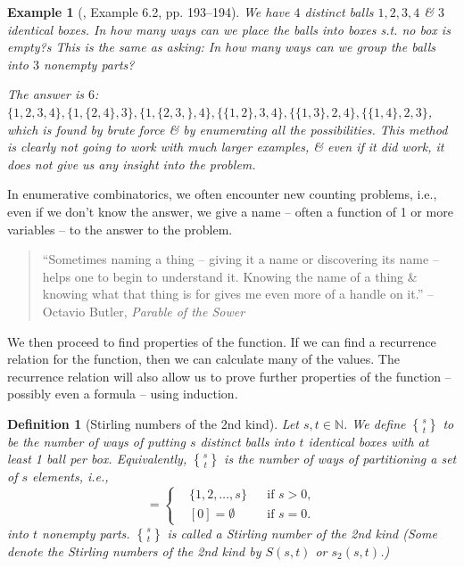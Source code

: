 \documentclass[oneside]{book}
\newtheorem{definition}{Definition}
\newtheorem{example}{Example}
\newcommand{\genstirlingII}[3]{%
	\genfrac{\{}{\}}{0pt}{#1}{#2}{#3}%
}
\newcommand{\stirlingII}[2]{\genstirlingII{}{#1}{#2}}
\begin{document}
\begin{example}[\cite{Shahriari2022}, Example 6.2, pp. 193--194]
	We have $4$ distinct balls $1,2,3,4$ \& $3$ identical boxes. In how many ways can we place the balls into boxes s.t. no box is empty?s This is the same as asking: In how many ways can we group the balls into $3$ nonempty parts?
	
	The answer is $6$: $\{1,2,3,4\},\{1,\{2,4\},3\},\{1,\{2,3,\},4\},\{\{1,2\},3,4\},\{\{1,3\},2,4\},\{\{1,4\},2,3\}$, which is found by brute force \& by enumerating all the possibilities. This method is clearly not going to work with much larger examples, \& even if it did work, it does not give us any insight into the problem.
\end{example}
In enumerative combinatorics, we often encounter new counting problems, i.e., even if we don't know the answer, we give a name -- often a function of 1 or more variables -- to the answer to the problem.
\begin{quote}
	``Sometimes naming a thing -- giving it a name or discovering its name -- helps one to begin to understand it. Knowing the name of a thing \& knowing what that thing is for gives me even more of a handle on it.'' -- {\sc Octavio Butler}, {\it Parable of the Sower}
\end{quote}
We then proceed to find properties of the function. If we can find a recurrence relation for the function, then we can calculate many of the values. The recurrence relation will also allow us to prove further properties of the function -- possibly even a formula -- using induction.

\begin{definition}[Stirling numbers of the 2nd kind]
	Let $s,t\in\mathbb{N}$. We define $\stirlingII{s}{t}$ to be the number of ways of putting $s$ distinct balls into $t$ identical boxes with at least 1 ball per box. Equivalently, $\stirlingII{s}{t}$ is the number of ways of partitioning a set of $s$ elements, i.e.,
	\begin{equation*}
		[s] = \left\{\begin{split}
			&\{1,2,\ldots,s\}&&\mbox{if } s > 0,\\
			&[0] = \emptyset&&\mbox{if } s = 0.
		\end{split}\right.
	\end{equation*}
	into $t$ nonempty parts. $\stirlingII{s}{t}$ is called a {\rm Stirling number of the 2nd kind} (Some denote the Stirling numbers of the 2nd kind by $S(s,t)$ or $s_2(s,t)$.)
\end{definition}
\end{document}

